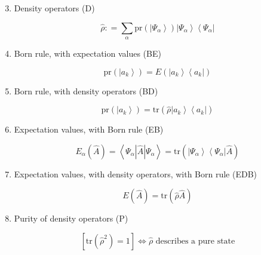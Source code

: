 \documentclass[9pt,handout]{beamer}
\newcommand{\pr}[0]{\text{pr}}
\newcommand{\tr}[0]{\text{tr}}
\begin{document}
\begin{frame}{}
\begin{block}{}
\begin{enumerate}
\setcounter{enumi}{2}
\item Density operators (D)

$$\widehat{\rho} : = \sum_{\alpha} \pr \left( \left\lvert \Psi_\alpha \right\rangle \right) \left\lvert \Psi_\alpha \right\rangle \left\langle \Psi_\alpha \right\rvert$$

\item Born rule, with expectation values (BE)

$$\pr \left( \left\lvert a_k \right\rangle \right) = E \left( \left\lvert a_k \right\rangle \left\langle a_k \right\rvert \right)$$

\item Born rule, with density operators (BD)

$$\pr \left( \left\lvert a_k \right\rangle \right) = \tr \left( \widehat{\rho} \left\lvert a_k \right\rangle \left\langle a_k \right\rvert \right)$$

\item Expectation values, with Born rule (EB)

$$E_\alpha \left( \widehat{A} \right) = \left\langle \Psi_\alpha \left\lvert \widehat{A} \right\rvert \Psi_\alpha \right\rangle = \tr \left( \left\lvert \Psi_\alpha \right\rangle \left\langle \Psi_\alpha \right\rvert \widehat{A} \right)$$

\item Expectation values, with density operators, with Born rule (EDB)

$$E \left( \widehat{A} \right) = \tr \left( \widehat{\rho} \widehat{A} \right)$$

\item Purity of density operators (P)

$$\left[ \tr \left( \widehat{\rho}^2 \right) = 1 \right] \Longleftrightarrow \widehat{\rho} \text{ describes a pure state}$$
\end{enumerate}
\end{block}
\end{frame}
\end{document}
